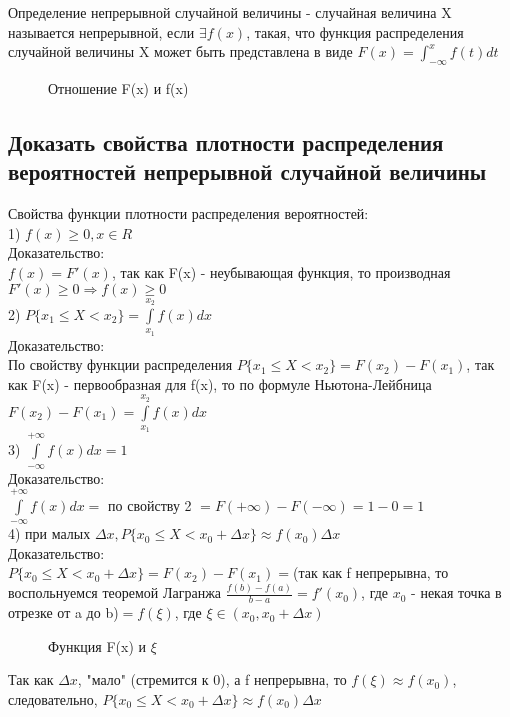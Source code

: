 Определение непрерывной случайной величины - случайная величина X называется непрерывной, если $\exists f(x)$, такая, что функция распределения случайной величины X может быть представлена в виде $F(x) = \int_{-\infty}^{x} f(t) dt$\\
\begin{figure}[H]
	\caption{Отношение F(x) и f(x)}
\end{figure}

\subsection{Доказать свойства плотности распределения вероятностей непрерывной случайной величины}
Свойства функции плотности распределения вероятностей:\\
1) $f(x) \geqslant 0, x \in R$\\

Доказательство:\\
$f(x) = F'(x)$, так как F(x) - неубывающая функция, то производная $F'(x) \geqslant 0 \Rightarrow f(x) \geqslant 0$\\

2) $P \{x_{1} \leqslant X < x_{2} \} = \int\limits_{x_{1}}^{x_{2}} f(x) dx$\\

Доказательство:\\
По свойству функции распределения $P \{x_{1} \leqslant X < x_{2} \} = F(x_{2}) - F(x_{1})$, так как F(x) - первообразная для f(x), то по формуле Ньютона-Лейбница $F(x_{2}) - F(x_{1}) = \int\limits_{x_{1}}^{x_{2}} f(x) dx$\\

3) $\int\limits_{-\infty}^{+\infty} f(x) dx = 1$\\

Доказательство:\\
$\int\limits_{-\infty}^{+\infty} f(x) dx = $ по свойству 2 $ = F(+\infty) - F(-\infty) = 1 - 0 = 1$\\

4) при малых $\Delta x, P \{x_{0} \leqslant X < x_{0} + \Delta x\} \approx f(x_{0}) \Delta x$\\

Доказательство:\\
$P \{x_{0} \leqslant X < x_{0} + \Delta x\} = F(x_{2}) - F(x_{1}) = $(так как f непрерывна, то воспольнуемся теоремой Лагранжа $\frac{f(b) - f(a)}{b - a} = f'(x_{0})$, где $x_{0}$ - некая точка в отрезке от a до b)$ = f(\xi)$, где $\xi \in (x_{0}, x_{0} + \Delta x)$\\
\begin{figure}[H]
	\center{\texttt{[image: x\_0]}}
	\caption{Функция F(x) и $\xi$}
\end{figure}
Так как $\Delta x$, "мало"  (стремится к 0), а f непрерывна, то $f(\xi) \approx f(x_{0})$, следовательно, $P \{x_{0} \leqslant X < x_{0} + \Delta x\} \approx f(x_{0}) \Delta x$\\

